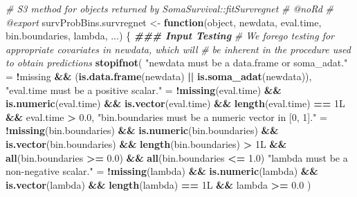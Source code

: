 \documentclass[
]{book}
\newenvironment{Shaded}{\begin{snugshade}}{\end{snugshade}}
\newcommand{\CommentTok}[1]{\textcolor[rgb]{0.56,0.35,0.01}{\textit{#1}}}
\newcommand{\ControlFlowTok}[1]{\textcolor[rgb]{0.13,0.29,0.53}{\textbf{#1}}}
\newcommand{\DocumentationTok}[1]{\textcolor[rgb]{0.56,0.35,0.01}{\textbf{\textit{#1}}}}
\newcommand{\FloatTok}[1]{\textcolor[rgb]{0.00,0.00,0.81}{#1}}
\newcommand{\FunctionTok}[1]{\textcolor[rgb]{0.13,0.29,0.53}{\textbf{#1}}}
\newcommand{\NormalTok}[1]{#1}
\newcommand{\OtherTok}[1]{\textcolor[rgb]{0.56,0.35,0.01}{#1}}
\newcommand{\SpecialCharTok}[1]{\textcolor[rgb]{0.81,0.36,0.00}{\textbf{#1}}}
\newcommand{\StringTok}[1]{\textcolor[rgb]{0.31,0.60,0.02}{#1}}
\begin{document}
\begin{Shaded}
\begin{Highlighting}[]
\CommentTok{\#\textquotesingle{} S3 method for objects returned by \textasciigrave{}SomaSurvival::fitSurvregnet\textasciigrave{}}
\CommentTok{\#\textquotesingle{} @noRd}
\CommentTok{\#\textquotesingle{} @export}
\NormalTok{survProbBins.survregnet }\OtherTok{\textless{}{-}} \ControlFlowTok{function}\NormalTok{(object, newdata, eval.time, bin.boundaries,}
\NormalTok{                                    lambda, ...) \{}
  \DocumentationTok{\#\#\# Input Testing}
  \CommentTok{\# We forego testing for appropriate covariates in \textasciigrave{}newdata\textasciigrave{}, which will}
  \CommentTok{\#   be inherent in the procedure used to obtain predictions}
  \FunctionTok{stopifnot}\NormalTok{(}
    \StringTok{"\textasciigrave{}newdata\textasciigrave{} must be a data.frame or soma\_adat."} \OtherTok{=} 
      \SpecialCharTok{!}\NormalTok{missing }\SpecialCharTok{\&\&}\NormalTok{ (}\FunctionTok{is.data.frame}\NormalTok{(newdata) }\SpecialCharTok{||} \FunctionTok{is.soma\_adat}\NormalTok{(newdata)),}
    \StringTok{"\textasciigrave{}eval.time\textasciigrave{} must be a positive scalar."} \OtherTok{=} 
      \SpecialCharTok{!}\FunctionTok{missing}\NormalTok{(eval.time) }\SpecialCharTok{\&\&} \FunctionTok{is.numeric}\NormalTok{(eval.time) }\SpecialCharTok{\&\&} 
      \FunctionTok{is.vector}\NormalTok{(eval.time) }\SpecialCharTok{\&\&} \FunctionTok{length}\NormalTok{(eval.time) }\SpecialCharTok{==}\NormalTok{ 1L }\SpecialCharTok{\&\&}\NormalTok{ eval.time }\SpecialCharTok{\textgreater{}} \FloatTok{0.0}\NormalTok{,}
    \StringTok{"\textasciigrave{}bin.boundaries\textasciigrave{} must be a numeric vector in [0, 1]."} \OtherTok{=} 
      \SpecialCharTok{!}\FunctionTok{missing}\NormalTok{(bin.boundaries) }\SpecialCharTok{\&\&} \FunctionTok{is.numeric}\NormalTok{(bin.boundaries) }\SpecialCharTok{\&\&} 
      \FunctionTok{is.vector}\NormalTok{(bin.boundaries) }\SpecialCharTok{\&\&} \FunctionTok{length}\NormalTok{(bin.boundaries) }\SpecialCharTok{\textgreater{}}\NormalTok{ 1L }\SpecialCharTok{\&\&} 
      \FunctionTok{all}\NormalTok{(bin.boundaries }\SpecialCharTok{\textgreater{}=} \FloatTok{0.0}\NormalTok{) }\SpecialCharTok{\&\&} \FunctionTok{all}\NormalTok{(bin.boundaries }\SpecialCharTok{\textless{}=} \FloatTok{1.0}\NormalTok{)}
    \StringTok{"\textasciigrave{}lambda\textasciigrave{} must be a non{-}negative scalar."} \OtherTok{=} 
      \SpecialCharTok{!}\FunctionTok{missing}\NormalTok{(lambda) }\SpecialCharTok{\&\&} \FunctionTok{is.numeric}\NormalTok{(lambda) }\SpecialCharTok{\&\&} 
      \FunctionTok{is.vector}\NormalTok{(lambda) }\SpecialCharTok{\&\&} \FunctionTok{length}\NormalTok{(lambda) }\SpecialCharTok{==}\NormalTok{ 1L }\SpecialCharTok{\&\&}\NormalTok{ lambda }\SpecialCharTok{\textgreater{}=} \FloatTok{0.0}
\NormalTok{  )}
  

\end{Highlighting}
\end{Shaded}
\end{document}
